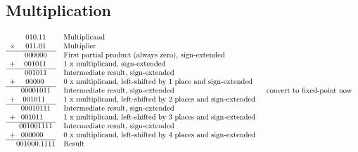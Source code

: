 \documentclass[12pt,openany, tikz,border=10pt]{book}
\begin{document}
			      	\subsection{Multiplication}
			      	 
			      	 
			      	\begin{align*}
			      		\begin{array}{r@{}c@{}l}
			      		       & 010.11                          & \text{\quad Multiplicand}                                                 \\
			      		\times & 011.01                          & \text{\quad Multiplier}                                                   \\ \cline{1-2}
			      		       & 000000                          & \text{\quad First partial product (always zero), sign-extended}           \\ 
			      		+      & \; \; \; \; 001011\phantom{.00} & \text{\quad 1 x multiplicand, sign-extended}                              \\ \cline{1-2}
			      		       & 001011                          & \text{\quad Intermediate result, sign-extended}                           \\ 
			      		+      & \phantom{0}00000\phantom{.0}    & \text{\quad 0 x multiplicand, left-shifted by 1 place and sign-extended}  \\ \cline{1-2}
			      		       & 00001011\phantom{}              & \text{\quad Intermediate result, sign-extended}                           \\ 
			      		+      & \phantom{00}001011\phantom{000} & \text{\quad 1 x multiplicand, left-shifted by 2 places and sign-extended} \\ \cline{1-2}
			      		       & 00010111                        & \text{\quad Intermediate result, sign-extended}                           \\ 
			      		+      & 001011\phantom{00}              & \text{\quad 1 x multiplicand, left-shifted by 3 places and sign-extended} \\ \cline{1-2}
			      		       & 001001111                       & \text{\quad Intermediate result, sign-extended}                           \\ 
			      		+      & 000000\phantom{00}              & \text{\quad 0 x multiplicand, left-shifted by 4 places and sign-extended} \\ \cline{1-2}
			      		       & 001000.1111                     & \text{\quad Result}                                                       \\
			      		\end{array} & \text{\quad convert to fixed-point now}
			      	\end{align*}
			      	
\end{document}

